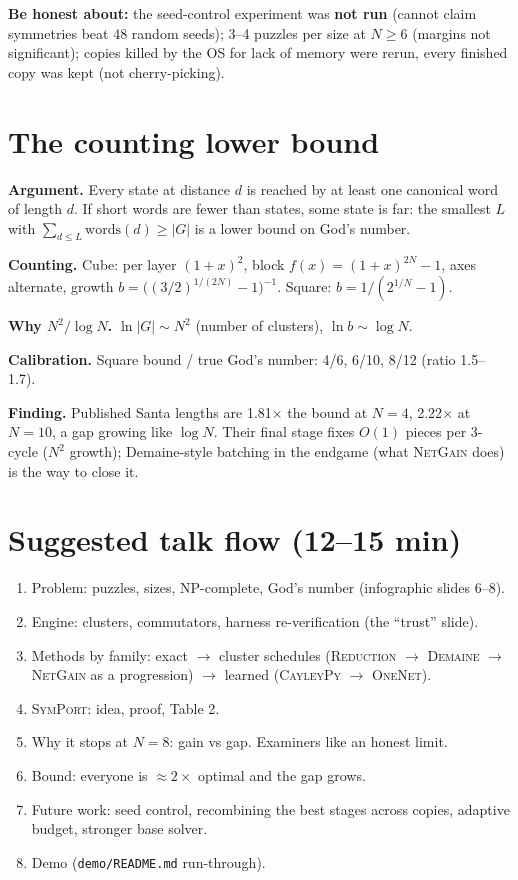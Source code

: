 \documentclass[10.5pt,a4paper]{article}
\newcommand{\M}[1]{\textsc{#1}}
\newcommand{\sub}[1]{\par\smallskip\textbf{#1}\quad}
\begin{document}
\begin{warnbox}
\textbf{Be honest about:} the seed-control experiment was \textbf{not run} (cannot claim symmetries beat 48 random seeds);
3--4 puzzles per size at $N\ge6$ (margins not significant); copies killed by the OS for lack of memory were rerun, every
finished copy was kept (not cherry-picking).
\end{warnbox}

\section{The counting lower bound}
\sub{Argument.} Every state at distance $d$ is reached by at least one canonical word of length $d$. If short words are fewer
than states, some state is far: the smallest $L$ with $\sum_{d\le L}\text{words}(d)\ge|G|$ is a lower bound on God's number.
\sub{Counting.} Cube: per layer $(1+x)^2$, block $f(x)=(1+x)^{2N}-1$, axes alternate, growth
$b=\bigl((3/2)^{1/(2N)}-1\bigr)^{-1}$. Square: $b=1/(2^{1/N}-1)$.
\sub{Why $N^2/\log N$.} $\ln|G|\sim N^2$ (number of clusters), $\ln b\sim\log N$.
\sub{Calibration.} Square bound / true God's number: 4/6, 6/10, 8/12 (ratio 1.5--1.7).
\sub{Finding.} Published Santa lengths are 1.81$\times$ the bound at $N=4$, 2.22$\times$ at $N=10$, a gap growing like $\log N$.
Their final stage fixes $O(1)$ pieces per 3-cycle ($N^2$ growth); Demaine-style batching in the endgame (what \M{NetGain} does)
is the way to close it.

\section{Suggested talk flow (12--15 min)}
\begin{enumerate}
\item Problem: puzzles, sizes, NP-complete, God's number (infographic slides 6--8).
\item Engine: clusters, commutators, harness re-verification (the ``trust'' slide).
\item Methods by family: exact $\to$ cluster schedules (\M{Reduction} $\to$ \M{Demaine} $\to$ \M{NetGain} as a progression) $\to$
learned (\M{CayleyPy} $\to$ \M{OneNet}).
\item \M{SymPort}: idea, proof, Table 2.
\item Why it stops at $N=8$: gain vs gap. Examiners like an honest limit.
\item Bound: everyone is $\approx2\times$ optimal and the gap grows.
\item Future work: seed control, recombining the best stages across copies, adaptive budget, stronger base solver.
\item Demo (\texttt{demo/README.md} run-through).
\end{enumerate}
\end{document}
